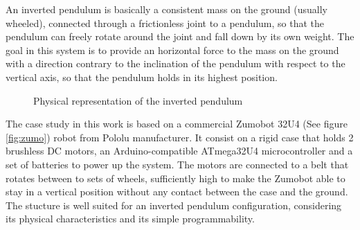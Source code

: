 
An inverted pendulum is basically a consistent mass on the ground (usually wheeled), connected through a frictionless joint to a pendulum, so that the pendulum can freely rotate around the joint and fall down by its own weight. The goal in this system is to provide an horizontal force to the mass on the ground with a direction contrary to the inclination of the pendulum with respect to the vertical axis, so that the pendulum holds in its highest position.

\begin{figure}[h]
	\centering
	\caption{Physical representation of the inverted pendulum}\label{fig:diag}
\end{figure}

The case study in this work is based on a commercial Zumobot 32U4 (See figure \ref{fig:zumo}) robot from Pololu manufacturer. It consist on a rigid case that holds 2 brushless DC motors, an Arduino-compatible ATmega32U4 microcontroller and a set of batteries to power up the system. The motors are connected to a belt that rotates between to sets of wheels, sufficiently high to make the Zumobot able to stay in a vertical position without any contact between the case and the ground. The stucture is well suited for an inverted pendulum configuration, considering its physical characteristics and its simple programmability.

